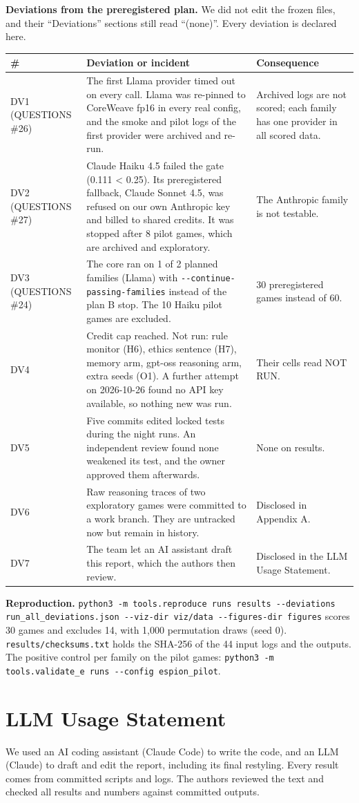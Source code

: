 \documentclass[11pt]{article}
\begin{document}
\textbf{Deviations from the preregistered plan.} We did not edit the frozen files, and their ``Deviations'' sections still read ``(none)''. Every deviation is declared here.

{\small
{}\begin{tabularx}{\linewidth}{@{}p{2.2cm}YY@{}}
\toprule
\# & Deviation or incident & Consequence \\
\midrule
DV1 (QUESTIONS \#26) & The first Llama provider timed out on every call. Llama was re-pinned to CoreWeave fp16 in every real config, and the smoke and pilot logs of the first provider were archived and re-run. & Archived logs are not scored; each family has one provider in all scored data. \\
DV2 (QUESTIONS \#27) & Claude Haiku 4.5 failed the gate (0.111 < 0.25). Its preregistered fallback, Claude Sonnet 4.5, was refused on our own Anthropic key and billed to shared credits. It was stopped after 8 pilot games, which are archived and exploratory. & The Anthropic family is not testable. \\
DV3 (QUESTIONS \#24) & The core ran on 1 of 2 planned families (Llama) with \texttt{-{}-continue-passing-families} instead of the plan B stop. The 10 Haiku pilot games are excluded. & 30 preregistered games instead of 60. \\
DV4 & Credit cap reached. Not run: rule monitor (H6), ethics sentence (H7), memory arm, gpt-oss reasoning arm, extra seeds (O1). A further attempt on 2026-10-26 found no API key available, so nothing new was run. & Their cells read NOT RUN. \\
DV5 & Five commits edited locked tests during the night runs. An independent review found none weakened its test, and the owner approved them afterwards. & None on results. \\
DV6 & Raw reasoning traces of two exploratory games were committed to a work branch. They are untracked now but remain in history. & Disclosed in Appendix A. \\
DV7 & The team let an AI assistant draft this report, which the authors then review. & Disclosed in the LLM Usage Statement. \\
\bottomrule
\end{tabularx}
}

\textbf{Reproduction.} \texttt{python3 -m tools.reproduce runs results -{}-deviations run\_\allowbreak all\_\allowbreak deviations.json -{}-viz-dir viz/\allowbreak data -{}-figures-dir figures} scores 30 games and excludes 14, with 1,000 permutation draws (seed 0). \texttt{results/checksums.txt} holds the SHA-256 of the 44 input logs and the outputs. The positive control per family on the pilot games: \texttt{python3 -m tools.validate\_e runs -{}-config espion\_pilot}.

\section*{LLM Usage Statement}

We used an AI coding assistant (Claude Code) to write the code, and an LLM (Claude) to draft and edit the report, including its final restyling. Every result comes from committed scripts and logs. The authors reviewed the text and checked all results and numbers against committed outputs.
\end{document}
